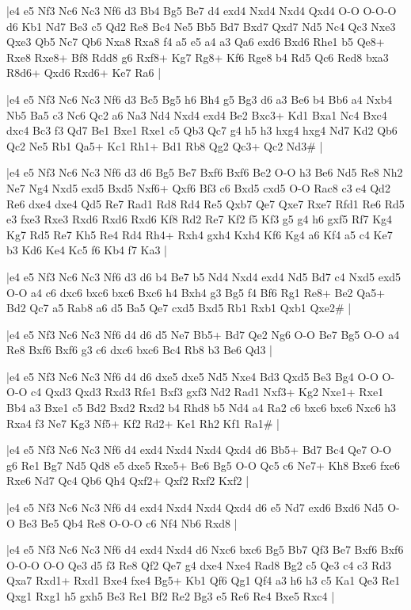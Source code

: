 \whitename{}
\blackname{}
\makegametitle
|e4 e5 Nf3 Nc6 Nc3 Nf6 d3 Bb4 Bg5 Be7 d4 exd4 Nxd4 Nxd4 Qxd4 O-O O-O-O d6 Kb1 Nd7 Be3 c5 Qd2 Re8 Bc4 Ne5 Bb5 Bd7 Bxd7 Qxd7 Nd5 Nc4 Qc3 Nxe3 Qxe3 Qb5 Nc7 Qb6 Nxa8 Rxa8 f4 a5 e5 a4 a3 Qa6 exd6 Bxd6 Rhe1 b5 Qe8+ Rxe8 Rxe8+ Bf8 Rdd8 g6 Rxf8+ Kg7 Rg8+ Kf6 Rge8 b4 Rd5 Qc6 Red8 bxa3 R8d6+ Qxd6 Rxd6+ Ke7 Ra6  |

\whitename{}
\blackname{}
\makegametitle
|e4 e5 Nf3 Nc6 Nc3 Nf6 d3 Bc5 Bg5 h6 Bh4 g5 Bg3 d6 a3 Be6 b4 Bb6 a4 Nxb4 Nb5 Ba5 c3 Nc6 Qc2 a6 Na3 Nd4 Nxd4 exd4 Be2 Bxc3+ Kd1 Bxa1 Nc4 Bxc4 dxc4 Bc3 f3 Qd7 Be1 Bxe1 Rxe1 c5 Qb3 Qc7 g4 h5 h3 hxg4 hxg4 Nd7 Kd2 Qb6 Qc2 Ne5 Rb1 Qa5+ Kc1 Rh1+ Bd1 Rb8 Qg2 Qc3+ Qc2 Nd3\#  |

\whitename{}
\blackname{}
\makegametitle
|e4 e5 Nf3 Nc6 Nc3 Nf6 d3 d6 Bg5 Be7 Bxf6 Bxf6 Be2 O-O h3 Be6 Nd5 Re8 Nh2 Ne7 Ng4 Nxd5 exd5 Bxd5 Nxf6+ Qxf6 Bf3 c6 Bxd5 cxd5 O-O Rac8 c3 e4 Qd2 Re6 dxe4 dxe4 Qd5 Re7 Rad1 Rd8 Rd4 Re5 Qxb7 Qe7 Qxe7 Rxe7 Rfd1 Re6 Rd5 e3 fxe3 Rxe3 Rxd6 Rxd6 Rxd6 Kf8 Rd2 Re7 Kf2 f5 Kf3 g5 g4 h6 gxf5 Rf7 Kg4 Kg7 Rd5 Re7 Kh5 Re4 Rd4 Rh4+ Rxh4 gxh4 Kxh4 Kf6 Kg4 a6 Kf4 a5 c4 Ke7 b3 Kd6 Ke4 Kc5 f6 Kb4 f7 Ka3  |

\whitename{}
\blackname{}
\makegametitle
|e4 e5 Nf3 Nc6 Nc3 Nf6 d3 d6 b4 Be7 b5 Nd4 Nxd4 exd4 Nd5 Bd7 c4 Nxd5 exd5 O-O a4 c6 dxc6 bxc6 bxc6 Bxc6 h4 Bxh4 g3 Bg5 f4 Bf6 Rg1 Re8+ Be2 Qa5+ Bd2 Qc7 a5 Rab8 a6 d5 Ba5 Qe7 cxd5 Bxd5 Rb1 Rxb1 Qxb1 Qxe2\#  |

\whitename{}
\blackname{}
\makegametitle
|e4 e5 Nf3 Nc6 Nc3 Nf6 d4 d6 d5 Ne7 Bb5+ Bd7 Qe2 Ng6 O-O Be7 Bg5 O-O a4 Re8 Bxf6 Bxf6 g3 c6 dxc6 bxc6 Bc4 Rb8 b3 Be6 Qd3  |

\whitename{}
\blackname{}
\makegametitle
|e4 e5 Nf3 Nc6 Nc3 Nf6 d4 d6 dxe5 dxe5 Nd5 Nxe4 Bd3 Qxd5 Be3 Bg4 O-O O-O-O c4 Qxd3 Qxd3 Rxd3 Rfe1 Bxf3 gxf3 Nd2 Rad1 Nxf3+ Kg2 Nxe1+ Rxe1 Bb4 a3 Bxe1 c5 Bd2 Bxd2 Rxd2 b4 Rhd8 b5 Nd4 a4 Ra2 c6 bxc6 bxc6 Nxc6 h3 Rxa4 f3 Ne7 Kg3 Nf5+ Kf2 Rd2+ Ke1 Rh2 Kf1 Ra1\#  |

\whitename{}
\blackname{}
\makegametitle
|e4 e5 Nf3 Nc6 Nc3 Nf6 d4 exd4 Nxd4 Nxd4 Qxd4 d6 Bb5+ Bd7 Bc4 Qe7 O-O g6 Re1 Bg7 Nd5 Qd8 e5 dxe5 Rxe5+ Be6 Bg5 O-O Qc5 c6 Ne7+ Kh8 Bxe6 fxe6 Rxe6 Nd7 Qc4 Qb6 Qh4 Qxf2+ Qxf2 Rxf2 Kxf2  |

\whitename{}
\blackname{}
\makegametitle
|e4 e5 Nf3 Nc6 Nc3 Nf6 d4 exd4 Nxd4 Nxd4 Qxd4 d6 e5 Nd7 exd6 Bxd6 Nd5 O-O Be3 Be5 Qb4 Re8 O-O-O c6 Nf4 Nb6 Rxd8  |

\whitename{}
\blackname{}
\makegametitle
|e4 e5 Nf3 Nc6 Nc3 Nf6 d4 exd4 Nxd4 d6 Nxc6 bxc6 Bg5 Bb7 Qf3 Be7 Bxf6 Bxf6 O-O-O O-O Qe3 d5 f3 Re8 Qf2 Qe7 g4 dxe4 Nxe4 Rad8 Bg2 c5 Qe3 c4 c3 Rd3 Qxa7 Rxd1+ Rxd1 Bxe4 fxe4 Bg5+ Kb1 Qf6 Qg1 Qf4 a3 h6 h3 c5 Ka1 Qe3 Re1 Qxg1 Rxg1 h5 gxh5 Be3 Re1 Bf2 Re2 Bg3 e5 Re6 Re4 Bxe5 Rxc4  |

